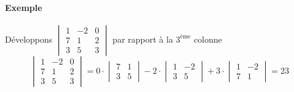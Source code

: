 \paragraph{Exemple} Développons $\begin{vmatrix} 1 & -2 & 0 \\ 7 & 1 & 2 \\ 3 & 5 & 3 \end{vmatrix}$ par rapport à la $3^{\text{ème}}$ colonne
$$\begin{vmatrix} 1 & -2 & 0 \\ 7 & 1 & 2 \\ 3 & 5 & 3 \end{vmatrix} = 
  0 \cdot \begin{vmatrix} 7 & 1 \\ 3 & 5 \end{vmatrix} 
  - 2 \cdot \begin{vmatrix} 1 & -2 \\ 3 & 5 \end{vmatrix} 
  + 3 \cdot \begin{vmatrix} 1 & -2 \\ 7 & 1 \end{vmatrix} 
= 23$$

